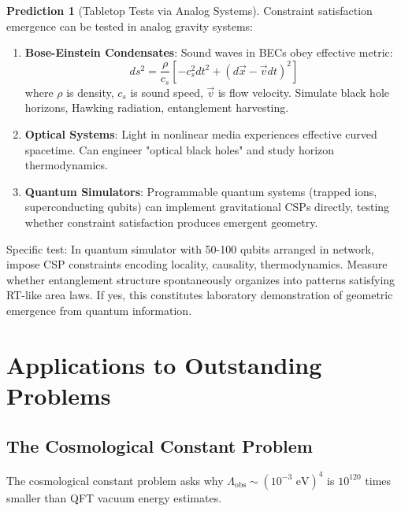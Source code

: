 \documentclass[11pt,a4paper]{article}
\theoremstyle{remark}
\theoremstyle{definition}
\newtheorem{prediction}{Prediction}[section]
\begin{document}
\begin{prediction}[Tabletop Tests via Analog Systems]
Constraint satisfaction emergence can be tested in analog gravity systems:
\begin{enumerate}[label=(\roman*)]
\item \textbf{Bose-Einstein Condensates}: Sound waves in BECs obey effective metric:
\begin{equation}
ds^2 = \frac{\rho}{c_s}\left[-c_s^2 dt^2 + (d\vec{x} - \vec{v} dt)^2\right]
\end{equation}
where $\rho$ is density, $c_s$ is sound speed, $\vec{v}$ is flow velocity. Simulate black hole horizons, Hawking radiation, entanglement harvesting.

\item \textbf{Optical Systems}: Light in nonlinear media experiences effective curved spacetime. Can engineer "optical black holes" and study horizon thermodynamics.

\item \textbf{Quantum Simulators}: Programmable quantum systems (trapped ions, superconducting qubits) can implement gravitational CSPs directly, testing whether constraint satisfaction produces emergent geometry.
\end{enumerate}

Specific test: In quantum simulator with 50-100 qubits arranged in network, impose CSP constraints encoding locality, causality, thermodynamics. Measure whether entanglement structure spontaneously organizes into patterns satisfying RT-like area laws. If yes, this constitutes laboratory demonstration of geometric emergence from quantum information.
\end{prediction}

\section{Applications to Outstanding Problems}
\label{sec:applications}

\subsection{The Cosmological Constant Problem}

The cosmological constant problem asks why $\Lambda_{\text{obs}} \sim (10^{-3} \text{ eV})^4$ is $10^{120}$ times smaller than QFT vacuum energy estimates.
\end{document}

